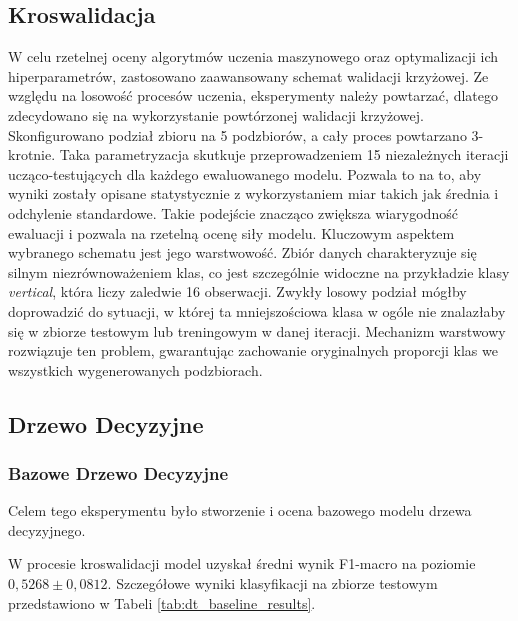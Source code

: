 \documentclass[12pt, a4paper]{article}
\begin{document}
\subsection{Kroswalidacja}
W celu rzetelnej oceny algorytmów uczenia maszynowego oraz optymalizacji ich hiperparametrów, zastosowano zaawansowany schemat walidacji krzyżowej. Ze względu na losowość procesów uczenia, eksperymenty należy powtarzać, dlatego zdecydowano się na wykorzystanie powtórzonej walidacji krzyżowej. Skonfigurowano podział zbioru na 5 podzbiorów, a cały proces powtarzano 3-krotnie. Taka parametryzacja skutkuje przeprowadzeniem 15 niezależnych iteracji ucząco-testujących dla każdego ewaluowanego modelu. Pozwala to na to, aby wyniki zostały opisane statystycznie z wykorzystaniem miar takich jak średnia i odchylenie standardowe. Takie podejście znacząco zwiększa wiarygodność ewaluacji i pozwala na rzetelną ocenę siły modelu. Kluczowym aspektem wybranego schematu jest jego warstwowość. Zbiór danych charakteryzuje się silnym niezrównoważeniem klas, co jest szczególnie widoczne na przykładzie klasy \textit{vertical}, która liczy zaledwie 16 obserwacji. Zwykły losowy podział mógłby doprowadzić do sytuacji, w której ta mniejszościowa klasa w ogóle nie znalazłaby się w zbiorze testowym lub treningowym w danej iteracji. Mechanizm warstwowy rozwiązuje ten problem, gwarantując zachowanie oryginalnych proporcji klas we wszystkich wygenerowanych podzbiorach.

\subsection{Drzewo Decyzyjne}

\subsubsection{Bazowe Drzewo Decyzyjne}

Celem tego eksperymentu było stworzenie i ocena bazowego modelu drzewa decyzyjnego.

W procesie kroswalidacji model uzyskał średni wynik F1-macro na poziomie $0{,}5268 \pm 0{,}0812$. Szczegółowe wyniki klasyfikacji na zbiorze testowym przedstawiono w Tabeli \ref{tab:dt_baseline_results}.
\end{document}

